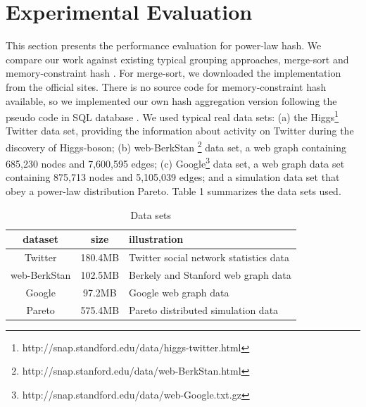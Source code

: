 \section{Experimental Evaluation}


This section presents the performance evaluation for power-law hash. We compare our work against existing typical grouping approaches, merge-sort \cite{dean2008mapreduce} and memory-constraint hash \cite{bartholomew2012mariadb}. For merge-sort, we downloaded the implementation from the official sites. There is no source code for memory-constraint hash available, so we implemented our own hash aggregation version following the pseudo code in SQL database \cite{HashAggregate15}. We used typical real data sets:  (a) the Higgs\footnote{http://snap.standford.edu/data/higgs-twitter.html} Twitter data set, providing the information about activity on Twitter during the discovery of Higgs-boson; (b) web-BerkStan \footnote{http://snap.stanford.edu/data/web-BerkStan.html} data set, a web graph containing 685,230 nodes and 7,600,595 edges;  (c) Google\footnote{http://snap.standford.edu/data/web-Google.txt.gz} data set, a web graph data set containing 875,713 nodes and 5,105,039 edges; and a simulation data set that obey a power-law distribution Pareto. Table 1 summarizes the data sets used.

\begin{table}[h]
  \caption{Data sets}
  \label{tab:dataset}
  \begin{tabular}{ccl}
    \toprule
    dataset &size & illustration\\
    \midrule
    Twitter & 180.4MB& Twitter social network statistics data\\
	web-BerkStan & 102.5MB& Berkely and Stanford web graph data\\
    Google & 97.2MB & Google web graph data\\
    Pareto & 575.4MB & Pareto distributed simulation data\\
    \bottomrule
  \end{tabular}
\end{table}

